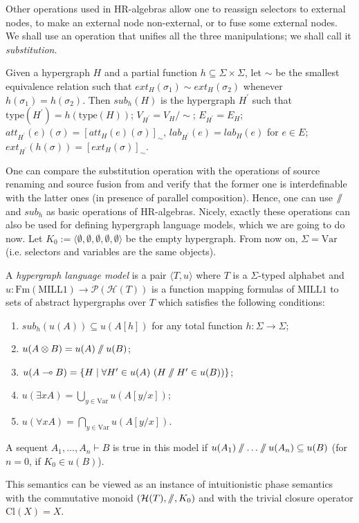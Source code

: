 \documentclass[a4paper,UKenglish,cleveref, autoref, thm-restate,pdfa]{lipics-v2021}
\newcommand{\eqdef}{:=}
\newcommand{\lab}{\mathit{lab}}
\newcommand{\att}{\mathit{att}}
\newcommand{\ext}{\mathit{ext}}
\newcommand{\type}{\mathrm{type}}
\newcommand{\HG}{\mathcal{H}}
\newcommand{\Var}{\mathrm{Var}}
\newcommand{\Fm}{\mathrm{Fm}}
\newcommand{\mconj}{\otimes}
\newcommand{\limpl}{\multimap}
\newcommand{\yields}{\vdash}
\newcommand{\MILLFO}{\mathrm{MILL}1}
\newcommand{\pc}{\mathbin{/\mkern-6mu/}}
\newcommand{\sub}{\mathit{sub}}
\begin{document}
Other operations used in HR-algebras allow one to reassign selectors to external nodes, to make an external node non-external, or to fuse some external nodes. We shall use an operation that unifies all the three manipulations; we shall call it \emph{substitution}.
\begin{definition}\label{definition:sub}
	Given a hypergraph $H$ and a partial function $h \subseteq \Sigma \times \Sigma$, let $\sim$ be the smallest equivalence relation such that $\ext_H(\sigma_1) \sim \ext_H(\sigma_2)$ whenever $h(\sigma_1) =h(\sigma_2)$. Then $\sub_h(H)$ is the hypergraph $H^\prime$ such that $\type(H^\prime) = h(\type(H))$; $V_{H^\prime} = V_H/\sim$; $E_{H^\prime}=E_H$; $\att_{H^\prime}(e)(\sigma) = [\att_H(e)(\sigma)]_\sim$, $\lab_{H^\prime}(e)=\lab_H(e)$ for $e \in E$; $\ext_{H^\prime}(h(\sigma)) = [\ext_H(\sigma)]_\sim$.
\end{definition}

One can compare the substitution operation with the operations of source renaming and source fusion from \cite{Rozenberg97} and verify that the former one is interdefinable with the latter ones (in presence of parallel composition). Hence, one can use $\pc$ and $\sub_h$ as basic operations of HR-algebras. Nicely, exactly these operations can also be used for defining hypergraph language models, which we are going to do now. Let $K_0 \eqdef \langle \emptyset, \emptyset, \emptyset, \emptyset, \emptyset \rangle$ be the empty hypergraph. From now on, $\Sigma=\Var$ (i.e. selectors and variables are the same objects).
\begin{definition}\label{definition:model}
	A \emph{hypergraph language model} is a pair $\langle T, u \rangle$ where $T$ is a $\Sigma$-typed alphabet and $u:\Fm(\MILLFO) \to \mathcal{P}(\mathcal{H}(T))$ is a function mapping formulas of $\MILLFO$ to sets of abstract hypergraphs over $T$ which satisfies the following conditions:
	\begin{enumerate}
		\item\label{item:def-model-sub} $\sub_h(u(A)) \subseteq u(A[h])$ for any total function $h:\Sigma \to \Sigma$;
		\item $u(A \mconj B) = u(A) \pc u(B)$;
		\item $u(A \limpl B) = \{H \mid \forall H^\prime \in u(A)\, \left(H \pc H^\prime \in u(B) \right) \}$;
		\item $u(\exists x A) = \bigcup\limits_{y \in \Var} u(A[y/x])$;
		\item $u(\forall x A) = \bigcap\limits_{y \in \Var} u(A[y/x])$.
	\end{enumerate}
	A sequent $A_1,\ldots,A_n \yields B$ is true in this model if $u(A_1) \pc \ldots \pc u(A_n) \subseteq u(B)$ (for $n=0$, if $K_0 \in u(B)$).
\end{definition}
This semantics can be viewed as an instance of intuitionistic phase semantics \cite{KanovichOT06} with the commutative monoid $(\HG(T),\pc,K_0)$ and with the trivial closure operator $\mathrm{Cl}(X)=X$.
\end{document}
